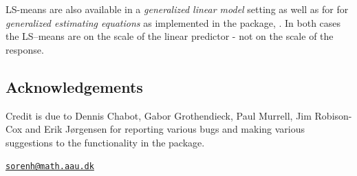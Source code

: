LS-means are also available in a \emph{generalized linear model} setting
as well as for for \emph{generalized estimating equations} as
implemented in the  package, \citep{geepack}. In both
cases the LS--means are on the scale of the linear predictor - not on
the scale of the response.

\hypertarget{acknowledgements}{%
\subsection{Acknowledgements}\label{acknowledgements}}

Credit is due to Dennis Chabot, Gabor Grothendieck, Paul Murrell, Jim
Robison-Cox and Erik Jørgensen for reporting various bugs and making
various suggestions to the functionality in the  package.




\address{%
Søren Højsgaard\\
Department of Mathematical Sciences, Aalborg University, Denmark\\
Skjernvej 4A\\ 9220 Aalborg Ø, Denmark\\
}
\href{mailto:sorenh@math.aau.dk}{\nolinkurl{sorenh@math.aau.dk}}

